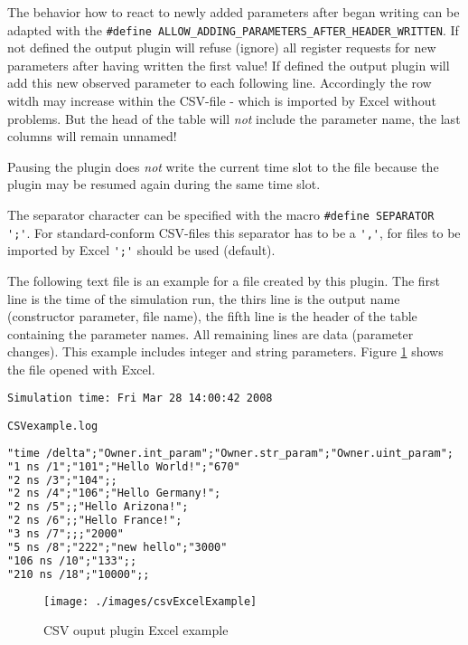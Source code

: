     The behavior how to react to newly added parameters after began writing can be
    adapted with the \lstinline[language=TeX]|#define ALLOW_ADDING_PARAMETERS_AFTER_HEADER_WRITTEN|.
    If not defined the output plugin will refuse (ignore) all register requests 
    for new parameters after having written the first value! If defined the output
    plugin will add this new observed parameter to each following line. Accordingly
    the row witdh may increase within the CSV-file - which is imported by Excel without
    problems. But the head of the table will \emph{not} include the parameter name, 
    the last columns will remain unnamed!
   
    Pausing the plugin does {\em not} write the current time slot to the file because the
    plugin may be resumed again during the same time slot.

    The separator character can be specified with the macro \lstinline[language=TeX]|#define SEPARATOR ';'|.
    For standard-conform CSV-files this separator has to be a \lstinline[language=TeX]|','|, 
    for files to be imported by Excel \lstinline[language=TeX]|';'| should be used (default).
    
    The following text file is an example for a file created by this plugin. The first line is the time of the simulation run, the thirs line is the output name (constructor parameter, file name), the fifth line is the header of the table containing the parameter names. All remaining lines are data (parameter changes). This example includes integer and string parameters. Figure \ref{fig:GAVcsvExcelExample} shows the file opened with Excel.

\noindent
\begin{minipage}{\textwidth}
\begin{lstlisting}[language=TeX, caption={CSV output file example}]
Simulation time: Fri Mar 28 14:00:42 2008

CSVexample.log
 
"time /delta";"Owner.int_param";"Owner.str_param";"Owner.uint_param";
"1 ns /1";"101";"Hello World!";"670"
"2 ns /3";"104";;
"2 ns /4";"106";"Hello Germany!";
"2 ns /5";;"Hello Arizona!";
"2 ns /6";;"Hello France!";
"3 ns /7";;;"2000"
"5 ns /8";"222";"new hello";"3000"
"106 ns /10";"133";;
"210 ns /18";"10000";;
\end{lstlisting}
\end{minipage}

\begin{figure}[htbp]
	\centerline{
		\texttt{[image: ./images/csvExcelExample]}}
	\caption{CSV ouput plugin Excel example}
	\label{fig:GAVcsvExcelExample}
\end{figure}



